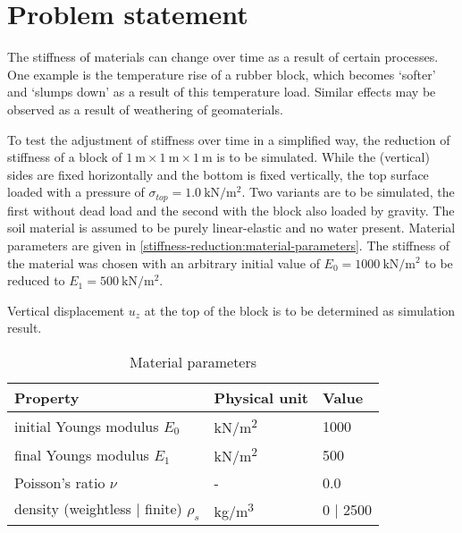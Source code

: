 \section{Problem statement}
\label{stiffness-reduction:sec:problem-statement}

The stiffness of materials can change over time as a result of certain
processes. One example is the temperature rise of a rubber block, which becomes
‘softer’ and ‘slumps down’ as a result of this temperature load. Similar
effects may be observed as a result of weathering of geomaterials.

To test the adjustment of stiffness over time in a simplified way, the
reduction of stiffness of a block of $\SI{1}{\metre} \times \SI{1}{\metre}
    \times \SI{1}{\metre}$ is to be simulated. While the (vertical) sides are fixed
horizontally and the bottom is fixed vertically, the top surface loaded with a
pressure of $\sigma_{top} = \SI[per-mode =
        symbol]{1.0}{\kilo\newton\per\square\metre}$. Two variants are to be simulated,
the first without dead load and the second with the block also loaded by
gravity. The soil material is assumed to be purely linear-elastic and no water
present. Material parameters are given in
\autoref{stiffness-reduction:material-parameters}. The stiffness of the
material was chosen with an arbitrary initial value of $E_0 = \SI[per-mode =
        symbol]{1000}{\kilo\newton\per\square\metre}$ to be reduced to $E_1 =
    \SI[per-mode = symbol]{500}{\kilo\newton\per\square\metre}$.

Vertical displacement $u_z$ at the top of the block is to be determined as
simulation result.

\begin{table}[htbp]
    \centering
    \caption{Material parameters}
    \label{stiffness-reduction:material-parameters}
    \begin{tabularx}{\textwidth}{XYY}

        \hline

        Property                                     & Physical unit                & Value      \\

        \hline

        initial Youngs modulus $E_0$                 & \si[per-mode =
        symbol]{\kilo\newton\per\square\metre}       & \SI{1000}{}                               \\

        final Youngs modulus $E_1$                   & \si[per-mode =
        symbol]{\kilo\newton\per\square\metre}       & \SI{500}{}                                \\

        Poisson's ratio $\nu$                        & -                            & \SI{0.0}{} \\

        density (weightless $\vert$ finite) $\rho_s$ & \si[per-mode =
        symbol]{\kilogram\per\cubic\metre}           & \SI{0}{} $\vert$ \SI{2500}{}              \\

        \hline
    \end{tabularx}
\end{table}

